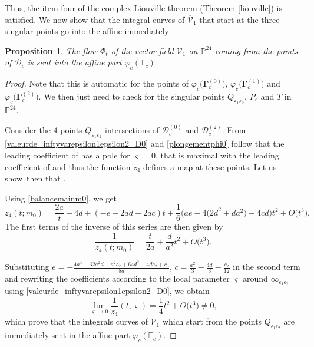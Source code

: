 \documentclass[pdftex]{sigma}
\numberwithin{equation}{section}
\newtheorem{Proposition}[Theorem]{Proposition}
 { \theoremstyle{definition}
\newtheorem{Definition}[Theorem]{Definition}
\newtheorem{Note}[Theorem]{Note}
\newtheorem{Example}[Theorem]{Example}
\newtheorem{Remark}[Theorem]{Remark} }
\begin{document}
Thus, the item four of the complex Liouville theorem (Theorem
\eqref{liouville}) is satisfied. We now show that the integral
curves of $\overline{\mathcal{V}}_1$ that start at the three
singular points go into the affine immediately
\begin{Proposition}
 The flow $\Phi_t$ of the vector field $\overline{\mathcal{V}}_1$ on $\mathbb{P}^{24}$ coming from the points of $\mathcal{D}_c$ is sent into the affine part $\varphi_c(\mathbb{F}_c)$.
\end{Proposition}
\begin{proof}
Note that this is automatic for the points of $\varphi_c\bigl(\mathbf{\Gamma}_c^{(0)}\bigr)$, $\varphi_c\bigl(\mathbf{\Gamma}_c^{ (1)}\bigr)$ and $\varphi_c\bigl(\mathbf{\Gamma}_c^{(2)}\bigr)$. We then just need to check for the singular points $Q_{\varepsilon_1\varepsilon_2}$, $P_{\varepsilon}$ and $T$ in $\mathbb{P}^{24}$.

 Consider the $4$ points $Q_{\varepsilon_1\varepsilon_2}$
intersections of $\mathcal{D}_c^{(0)}$ and
$\mathcal{D}_c^{(2)}$. From
\eqref{valeurde_inftyvarepsilon1epsilon2_D0} and
\eqref{plongementphi0} follow that the leading coefficient of
 has a pole
for $\varsigma=0$, that is maximal with the leading coefficient of
 and thus the
function $z_4$ defines a map at these points.
 Let us show~then that .

 Using \eqref{balancemainm0}, we get
 \[
 z_4(t;m_0)=\frac{2a}{t}-4d+(-e+2ad-2ac)t+\frac{1}{6}\bigl(ae-4\bigl(2d^2+da^2\bigr)+4cd\bigr)t^2+O\bigl(t^3\bigr).
 \]
 The first terms of the inverse of this series are then
 given by
\begin{equation}\label{inverse4}
 \frac{1}{z_4(t;m_0)}=\frac{t}{2a}+\frac{d}{a^2}t^2+O\bigl(t^3\bigr).
\end{equation}

Substituting
$e=-\frac{4a^4-32a^2d-a^2c_2+64d^2+4dc_2+c_3}{8a}$, $c=\frac{a^2}{3}-\frac{4d
}{3}-\frac{c_2}{12}$ in the second term and rewriting the
coefficients according to the local parameter $\varsigma$ around
$\infty_{\epsilon_1\epsilon_2}$ using
\eqref{valeurde_inftyvarepsilon1epsilon2_D0}, we obtain
\[\lim \limits_{\varsigma\rightarrow
 0}\frac{1}{z_4}(t,\varsigma)=\frac{1}{4}t^2+O\bigl(t^3\bigr)\neq0,\]
 which prove that the integrals curves of
 $\overline{\mathcal{V}}_1$ which start from the points $Q_{\epsilon_1\epsilon_2}$
 are immediately sent in the affine part $\varphi_c(\mathbb{F}_c)$.


\end{proof}
\end{document}
